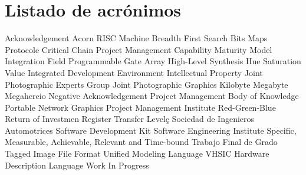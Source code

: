 \chapter{Listado de acrónimos}

{\small
\begin{acronym}[XXXXXXXX]
	 {Acknowledgement}
	 {Acorn RISC Machine}
	 {Breadth First Search}
	 {Bits Maps Protocole}
	 {Critical Chain Project Management}
	 {Capability Maturity Model Integration}
	 {Field Programmable Gate Array}
	 {High-Level Synthesis}
	 {Hue Saturation Value}
	 {Integrated Development Environment}
	 {Intellectual Property}
	 {Joint Photographic Experts Group}
	 {Joint Photographic Graphics}
	 {Kilobyte}
	 {Megabyte}
	 {Megahercio}
	 {Negative Acknowledgement}
	 {Project Management Body of Knowledge}
	 {Portable Network Graphics}
	 {Project Management Institute}
	 {Red-Green-Blue}
	 {Return of Investmen}
	 {Register Transfer Level}ç
	 {Sociedad de Ingenieros Automotrices}
	 {Software Development Kit}
	 {Software Engineering Institute}
	 {Specific, Measurable, Achievable, Relevant and Time-bound}
	 {Trabajo Final de Grado}
	 {Tagged Image File Format}
	 {Unified Modeling Language}
	 {VHSIC Hardware Description Language}
	 {Work In Progress}
\end{acronym}
}



